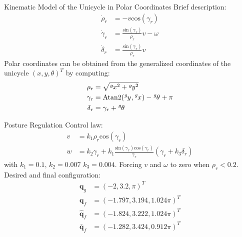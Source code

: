 \documentclass[10pt]{beamer}
\begin{document}
    \begin{frame}{Kinematic Model of the Unicycle in Polar Coordinates}
        \justifying
        Brief description:
        \begin{align*}
            \dot{\rho}_r &= -v \text{cos}(\gamma_r) \\
            \dot{\gamma}_r &= \frac{\text{sin}(\gamma_r)}{\rho_r}v - \omega \\
            \dot{\delta}_r &= \frac{\text{sin}(\gamma_r)}{\rho_r}v
        \end{align*}
        Polar coordinates can be obtained from the generalized
        coordinates of the unicycle $(x, y, \theta)^T$ by computing:
        \begin{align*}
            \rho_r &= \sqrt{\tensor[^g]{x}{^2} + \tensor[^g]{y}{^2}} \\
            \gamma_r &= \text{Atan2}(\tensor[^g]{y}{}, \tensor[^g]{x}{}) - \tensor[^g]{\theta}{} + \pi \\
            \delta_r &= \gamma_r + \tensor[^g]{\theta}{}
        \end{align*}
    \end{frame}

    \begin{frame}{Posture Regulation}
        \justifying
        Control law:
        \begin{align*}
            v &= k_1 \rho_r \text{cos}(\gamma_r) \\
            w &= k_2 \gamma_r + k_1 \frac{\text{sin}(\gamma_r) \text{cos}(\gamma_r)}{\gamma_r}(\gamma_r + k_3 \delta_r)
        \end{align*}
        with $k_1 = 0.1$, $k_2 = 0.007$ $k_3 = 0.004$. Forcing $v$ and $\omega$ to zero when
        $\rho_r < 0.2$. Desired and final configuration:
        \begin{align*}
            \bm{q}_g &= (-2, 3.2, \pi)^T \\
            \bm{q}_f &= (-1.797, 3.194, 1.024\pi)^T \\
            \bm{\hat{q}}_f &= (-1.824, 3.222, 1.024\pi)^T \\
            \bm{\bar{q}}_f &= (-1.282, 3.424, 0.912\pi)^T
        \end{align*}
    \end{frame}
\end{document}
